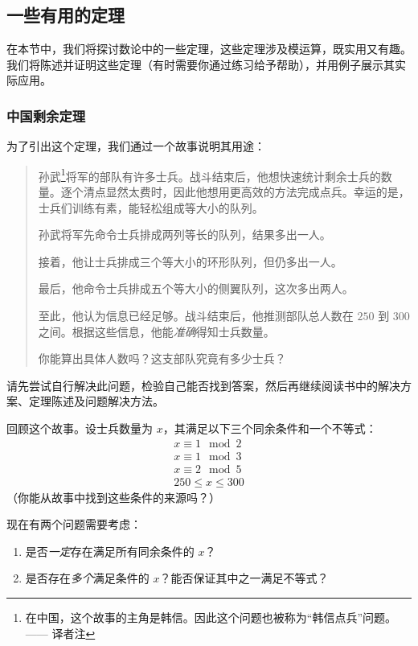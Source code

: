 
\subsection{一些有用的定理}

在本节中，我们将探讨数论中的一些定理，这些定理涉及模运算，既实用又有趣。我们将陈述并证明这些定理（有时需要你通过练习给予帮助），并用例子展示其实际应用。

\subsubsection*{中国剩余定理}

为了引出这个定理，我们通过一个故事说明其用途：

\begin{quotation}
    孙武\footnote{在中国，这个故事的主角是韩信。因此这个问题也被称为``韩信点兵''问题。—— 译者注}将军的部队有许多士兵。战斗结束后，他想快速统计剩余士兵的数量。逐个清点显然太费时，因此他想用更高效的方法完成点兵。幸运的是，士兵们训练有素，能轻松组成等大小的队列。
    
    孙武将军先命令士兵排成两列等长的队列，结果多出一人。

    接着，他让士兵排成三个等大小的环形队列，但仍多出一人。

    最后，他命令士兵排成五个等大小的侧翼队列，这次多出两人。

    至此，他认为信息已经足够。战斗结束后，他推测部队总人数在 $250$ 到 $300$ 之间。根据这些信息，他能\emph{准确}得知士兵数量。
    
    你能算出具体人数吗？这支部队究竟有多少士兵？
\end{quotation}

请先尝试自行解决此问题，检验自己能否找到答案，然后再继续阅读书中的解决方案、定理陈述及问题解决方法。

回顾这个故事。设士兵数量为 $x$，其满足以下三个同余条件和一个不等式：
\begin{align*}
    x \equiv 1 \mod 2 \\
    x \equiv 1 \mod 3 \\
    x \equiv 2 \mod 5 \\
    250 \le x \le 300
\end{align*}
（你能从故事中找到这些条件的来源吗？）

现在有两个问题需要考虑：
\begin{enumerate}[label=(\arabic*)]
    \item 是否\emph{一定}存在满足所有同余条件的 $x$？
    \item 是否存在\emph{多个}满足条件的 $x$？能否保证其中之一满足不等式？
\end{enumerate}

